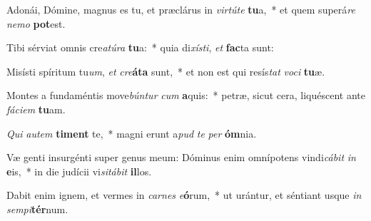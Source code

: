 \item Adonái, Dómine, magnus es tu, et præclárus in \textit{vir}\textit{tú}\textit{te} \textbf{tu}a,~* et quem superá\textit{re} \textit{ne}\textit{mo} \textbf{pot}est.
\item Tibi sérviat omnis cre\textit{a}\textit{tú}\textit{ra} \textbf{tu}a:~* quia di\textit{xís}\textit{ti}, \textit{et} \textbf{fac}ta sunt:
\item Misísti spíritum tu\textit{um}, \textit{et} \textit{cre}\textbf{á}\textbf{ta} sunt,~* et non est qui resís\textit{tat} \textit{vo}\textit{ci} \textbf{tu}æ.
\item Montes a fundaméntis move\textit{bún}\textit{tur} \textit{cum} \textbf{a}quis:~* petræ, sicut cera, liquéscent ante \textit{fá}\textit{ci}\textit{em} \textbf{tu}am.
\item \textit{Qui} \textit{au}\textit{tem} \textbf{ti}\textbf{ment} te,~* magni erunt a\textit{pud} \textit{te} \textit{per} \textbf{óm}nia.
\item Væ genti insurgénti super genus meum: Dóminus enim omnípotens vindi\textit{cá}\textit{bit} \textit{in} \textbf{e}is,~* in die judícii vi\textit{si}\textit{tá}\textit{bit} \textbf{il}los.
\item Dabit enim ignem, et vermes in \textit{car}\textit{nes} \textit{e}\textbf{ó}rum,~* ut urántur, et séntiant usque \textit{in} \textit{sem}\textit{pi}\textbf{tér}num.
